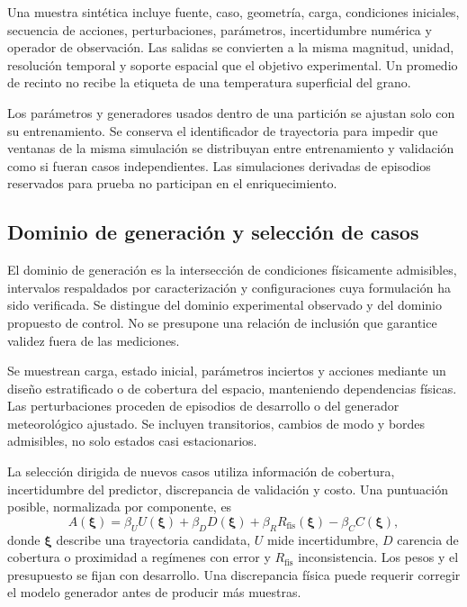 Una muestra sintética incluye fuente, caso, geometría, carga, condiciones iniciales, secuencia de acciones, perturbaciones, parámetros, incertidumbre numérica y operador de observación. Las salidas se convierten a la misma magnitud, unidad, resolución temporal y soporte espacial que el objetivo experimental. Un promedio de recinto no recibe la etiqueta de una temperatura superficial del grano.

Los parámetros y generadores usados dentro de una partición se ajustan solo con su entrenamiento. Se conserva el identificador de trayectoria para impedir que ventanas de la misma simulación se distribuyan entre entrenamiento y validación como si fueran casos independientes. Las simulaciones derivadas de episodios reservados para prueba no participan en el enriquecimiento.

\subsection{Dominio de generación y selección de casos}

El dominio de generación es la intersección de condiciones físicamente admisibles, intervalos respaldados por caracterización y configuraciones cuya formulación ha sido verificada. Se distingue del dominio experimental observado y del dominio propuesto de control. No se presupone una relación de inclusión que garantice validez fuera de las mediciones.

Se muestrean carga, estado inicial, parámetros inciertos y acciones mediante un diseño estratificado o de cobertura del espacio, manteniendo dependencias físicas. Las perturbaciones proceden de episodios de desarrollo o del generador meteorológico ajustado. Se incluyen transitorios, cambios de modo y bordes admisibles, no solo estados casi estacionarios.

La selección dirigida de nuevos casos utiliza información de cobertura, incertidumbre del predictor, discrepancia de validación y costo. Una puntuación posible, normalizada por componente, es
\begin{equation}
A(\boldsymbol\xi)=
\beta_U U(\boldsymbol\xi)+
\beta_D D(\boldsymbol\xi)+
\beta_R R_{\mathrm{fis}}(\boldsymbol\xi)-
\beta_C C(\boldsymbol\xi),
\label{met:adquisicion}
\end{equation}
donde $\boldsymbol\xi$ describe una trayectoria candidata, $U$ mide incertidumbre, $D$ carencia de cobertura o proximidad a regímenes con error y $R_{\mathrm{fis}}$ inconsistencia. Los pesos y el presupuesto se fijan con desarrollo. Una discrepancia física puede requerir corregir el modelo generador antes de producir más muestras.

